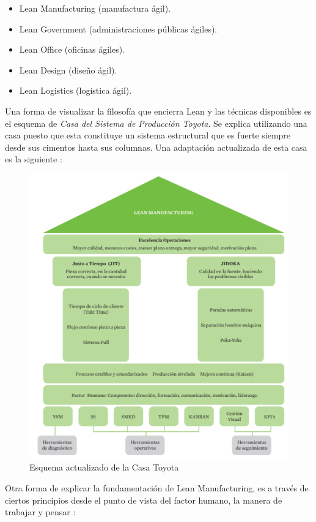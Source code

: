 \begin{itemize}
\item Lean Manufacturing (manufactura ágil).
\item Lean Government (administraciones públicas ágiles).
\item Lean Office (oficinas ágiles).
\item Lean Design (diseño ágil).
\item Lean Logistics (logística ágil).
\end{itemize}

Una forma de visualizar la filosofía que encierra Lean y las técnicas disponibles es el esquema de \textit{Casa del Sistema de Producción Toyota}. Se explica utilizando una casa puesto que esta constituye un sistema estructural que es fuerte siempre desde sus cimentos hasta sus columnas. Una adaptación actualizada de esta casa es la siguiente \citep{leansis2017}:


\begin{figure}
\centering
\includegraphics[scale=0.8]{images/casalean.png}
\caption{Esquema actualizado de la Casa Toyota \citep{leansis2017} }
\end{figure}
 

Otra forma de explicar la fundamentación de Lean Manufacturing, es a través de ciertos principios desde el punto de vista del factor humano, la manera de trabajar y pensar \citep{leansis2017}:


